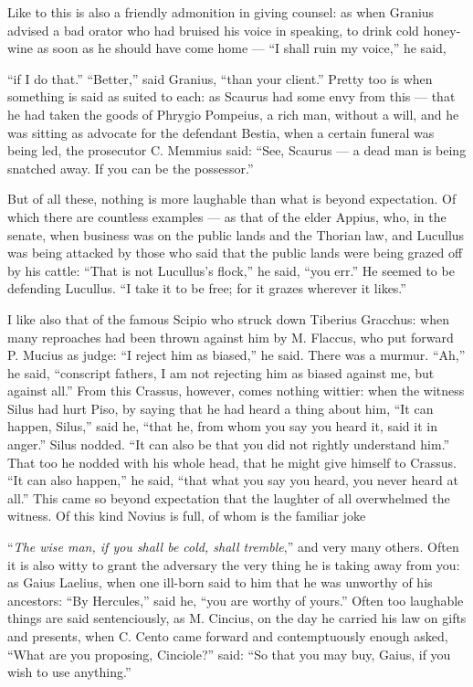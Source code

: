  Like to this is also a friendly admonition in giving counsel: as when Granius advised a bad orator who had bruised his voice in speaking, to drink cold honey-wine as soon as he should have come home — ``I shall ruin my voice,'' he said,

 ``if I do that.'' ``Better,'' said Granius, ``than your client.'' Pretty too is when something is said as suited to each: as Scaurus had some envy from this — that he had taken the goods of Phrygio Pompeius, a rich man, without a will, and he was sitting as advocate for the defendant Bestia, when a certain funeral was being led, the prosecutor C. Memmius said: ``See, Scaurus — a dead man is being snatched away. If you can be the possessor.''

 But of all these, nothing is more laughable than what is beyond expectation. Of which there are countless examples — as that of the elder Appius, who, in the senate, when business was on the public lands and the Thorian law, and Lucullus was being attacked by those who said that the public lands were being grazed off by his cattle: ``That is not Lucullus's flock,'' he said, ``you err.'' He seemed to be defending Lucullus. ``I take it to be free; for it grazes wherever it likes.''

 I like also that of the famous Scipio who struck down Tiberius Gracchus: when many reproaches had been thrown against him by M. Flaccus, who put forward P. Mucius as judge: ``I reject him as biased,'' he said. There was a murmur. ``Ah,'' he said, ``conscript fathers, I am not rejecting him as biased against me, but against all.'' From this Crassus, however, comes nothing wittier: when the witness Silus had hurt Piso, by saying that he had heard a thing about him, ``It can happen, Silus,'' said he, ``that he, from whom you say you heard it, said it in anger.'' Silus nodded. ``It can also be that you did not rightly understand him.'' That too he nodded with his whole head, that he might give himself to Crassus. ``It can also happen,'' he said, ``that what you say you heard, you never heard at all.'' This came so beyond expectation that the laughter of all overwhelmed the witness. Of this kind Novius is full, of whom is the familiar joke

 ``\textit{The wise man, if you shall be cold, shall tremble},'' and very many others. Often it is also witty to grant the adversary the very thing he is taking away from you: as Gaius Laelius, when one ill-born said to him that he was unworthy of his ancestors: ``By Hercules,'' said he, ``you are worthy of yours.'' Often too laughable things are said sentenciously, as M. Cincius, on the day he carried his law on gifts and presents, when C. Cento came forward and contemptuously enough asked, ``What are you proposing, Cinciole?'' said: ``So that you may buy, Gaius, if you wish to use anything.''

